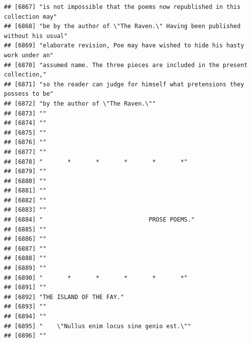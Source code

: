 \documentclass{article}\usepackage[]{graphicx}\usepackage[]{color}
\makeatletter
\newenvironment{kframe}{%
 \def\at@end@of@kframe{}%
 \ifinner\ifhmode%
  \def\at@end@of@kframe{\end{minipage}}%
  \begin{minipage}{\columnwidth}%
 \fi\fi%
 \def\FrameCommand##1{\hskip\@totalleftmargin \hskip-\fboxsep
 \colorbox{shadecolor}{##1}\hskip-\fboxsep
     \hskip-\linewidth \hskip-\@totalleftmargin \hskip\columnwidth}%
 \MakeFramed {\advance\hsize-\width
   \@totalleftmargin\z@ \linewidth\hsize
   \@setminipage}}%
 {\par\unskip\endMakeFramed%
 \at@end@of@kframe}
\newenvironment{knitrout}{}{} %
\makeatother
\begin{document}
\begin{knitrout}
\begin{kframe}
\begin{verbatim}
## [6867] "is not impossible that the poems now republished in this collection may"     
## [6868] "be by the author of \"The Raven.\" Having been published without his usual"  
## [6869] "elaborate revision, Poe may have wished to hide his hasty work under an"     
## [6870] "assumed name. The three pieces are included in the present collection,"      
## [6871] "so the reader can judge for himself what pretensions they possess to be"     
## [6872] "by the author of \"The Raven.\""                                             
## [6873] ""                                                                            
## [6874] ""                                                                            
## [6875] ""                                                                            
## [6876] ""                                                                            
## [6877] ""                                                                            
## [6878] "       *       *       *       *       *"                                    
## [6879] ""                                                                            
## [6880] ""                                                                            
## [6881] ""                                                                            
## [6882] ""                                                                            
## [6883] ""                                                                            
## [6884] "                              PROSE POEMS."                                  
## [6885] ""                                                                            
## [6886] ""                                                                            
## [6887] ""                                                                            
## [6888] ""                                                                            
## [6889] ""                                                                            
## [6890] "       *       *       *       *       *"                                    
## [6891] ""                                                                            
## [6892] "THE ISLAND OF THE FAY."                                                      
## [6893] ""                                                                            
## [6894] ""                                                                            
## [6895] "    \"Nullus enim locus sine genio est.\""                                   
## [6896] ""                                                                            

\end{verbatim}
\end{kframe}
\end{knitrout}
\end{document}
